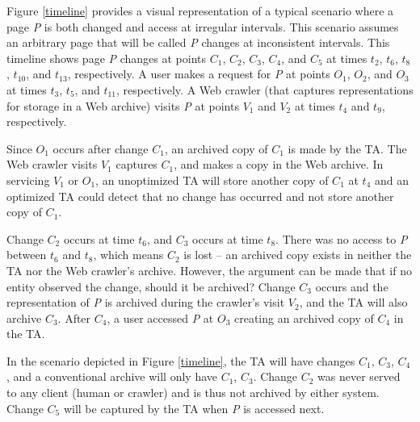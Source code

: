 \documentclass[runningheads,a4paper]{llncs}
\begin{document}
Figure \ref{timeline} provides a visual representation of a typical scenario where a page \emph{P} is both changed and access at irregular intervals. This scenario assumes an arbitrary page that will be called \emph{P} changes at inconsistent intervals. This timeline shows page \emph{P} changes at points $C_{1}$, $C_{2}$, $C_{3}$, $C_{4}$, and $C_{5}$ at times $t_{2}$, $t_{6}$, $t_{8}$, $t_{10}$, and $t_{13}$, respectively. A user makes a request for \emph{P} at points $O_{1}$, $O_{2}$, and $O_{3}$ at times $t_{3}$, $t_{5}$, and $t_{11}$, respectively. A Web crawler (that captures representations for storage in a Web archive) visits \emph{P} at points $V_{1}$ and $V_{2}$ at times $t_{4}$ and $t_{9}$, respectively. 

Since $O_{1}$ occurs after change $C_{1}$, an archived copy of $C_{1}$
is made by the TA. 
The Web crawler visits $V_{1}$ captures $C_{1}$, and makes a
copy in the Web archive.  In servicing $V_{1}$ or $O_{1}$, an unoptimized TA will store
another copy of $C_{1}$ at $t_{4}$ and an optimized TA could detect that no 
change has occurred and not store another copy of $C_{1}$.

Change $C_{2}$ occurs at time $t_{6}$, and $C_{3}$ occurs at time
$t_{8}$. There was no access to \emph{P} between $t_{6}$ and $t_{8}$,
which means $C_{2}$ is lost -- an archived copy exists in neither the
TA nor the Web crawler's archive. However, the argument can be made
that if no entity observed the change, should it be archived?
Change $C_{3}$ occurs and the representation of \emph{P} is archived during the crawler's visit
$V_{2}$, and the TA will also archive $C_{3}$.  After $C_{4}$, a user
accessed \emph{P} at $O_{3}$ creating an archived copy of $C_{4}$ in
the TA.  

In the scenario depicted in Figure \ref{timeline}, the TA will have
changes {$C_{1}$, $C_{3}$, $C_{4}$}, and a conventional archive will
only have {$C_{1}$, $C_{3}$}.  Change $C_{2}$ was never served to any
client (human or crawler) and is thus not archived by either system.
Change $C_{5}$ will be captured by the TA when \emph{P} is accessed
next.

\end{document}
